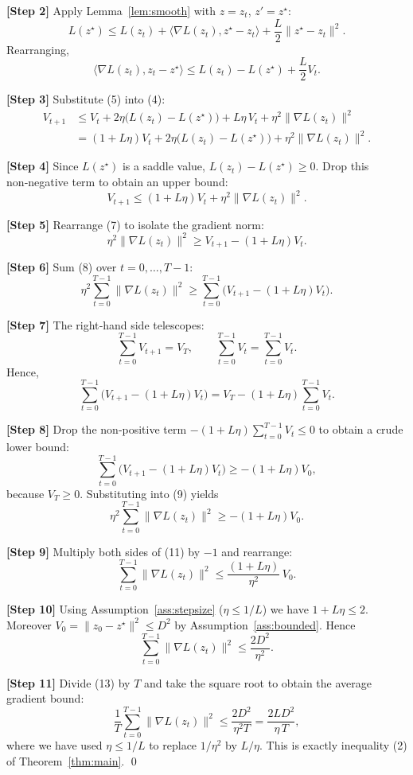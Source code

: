 \documentclass{article}
\begin{document}
\noindent\textbf{[Step 2]} Apply Lemma~\ref{lem:smooth} with $z=z_t$, $z'=z^\star$:
\[
L(z^\star)\le L(z_t)+\langle \nabla L(z_t),z^\star-z_t\rangle+\frac{L}{2}\|z^\star-z_t\|^{2}.
\]
Rearranging,
\[
\langle \nabla L(z_t),z_t-z^\star\rangle\le L(z_t)-L(z^\star)+\frac{L}{2}V_t.
\tag{5}
\]

\noindent\textbf{[Step 3]} Substitute (5) into (4):
\[
\begin{aligned}
V_{t+1}
&\le V_t+2\eta\bigl(L(z_t)-L(z^\star)\bigr)
+L\eta\,V_t+\eta^{2}\|\nabla L(z_t)\|^{2}\\
&= (1+L\eta)V_t+2\eta\bigl(L(z_t)-L(z^\star)\bigr)
+\eta^{2}\|\nabla L(z_t)\|^{2}.
\end{aligned}
\tag{6}
\]

\noindent\textbf{[Step 4]} Since $L(z^\star)$ is a saddle value, $L(z_t)-L(z^\star)\ge 0$. Drop this non‑negative term to obtain an upper bound:
\[
V_{t+1}\le (1+L\eta)V_t+\eta^{2}\|\nabla L(z_t)\|^{2}.
\tag{7}
\]

\noindent\textbf{[Step 5]} Rearrange (7) to isolate the gradient norm:
\[
\eta^{2}\|\nabla L(z_t)\|^{2}\ge V_{t+1}-(1+L\eta)V_t.
\tag{8}
\]

\noindent\textbf{[Step 6]} Sum (8) over $t=0,\dots,T-1$:
\[
\eta^{2}\sum_{t=0}^{T-1}\|\nabla L(z_t)\|^{2}
\ge \sum_{t=0}^{T-1}\bigl(V_{t+1}-(1+L\eta)V_t\bigr).
\tag{9}
\]

\noindent\textbf{[Step 7]} The right‑hand side telescopes:
\[
\sum_{t=0}^{T-1}V_{t+1}=V_T,\qquad
\sum_{t=0}^{T-1}V_t= \sum_{t=0}^{T-1}V_t.
\]
Hence,
\[
\sum_{t=0}^{T-1}\bigl(V_{t+1}-(1+L\eta)V_t\bigr)
=V_T-(1+L\eta)\sum_{t=0}^{T-1}V_t.
\tag{10}
\]

\noindent\textbf{[Step 8]} Drop the non‑positive term $-(1+L\eta)\sum_{t=0}^{T-1}V_t\le 0$ to obtain a crude lower bound:
\[
\sum_{t=0}^{T-1}\bigl(V_{t+1}-(1+L\eta)V_t\bigr)\ge - (1+L\eta) V_0,
\]
because $V_T\ge 0$. Substituting into (9) yields
\[
\eta^{2}\sum_{t=0}^{T-1}\|\nabla L(z_t)\|^{2}
\ge - (1+L\eta) V_0 .
\tag{11}
\]

\noindent\textbf{[Step 9]} Multiply both sides of (11) by $-1$ and rearrange:
\[
\sum_{t=0}^{T-1}\|\nabla L(z_t)\|^{2}
\le \frac{(1+L\eta)}{\eta^{2}}\,V_0 .
\tag{12}
\]

\noindent\textbf{[Step 10]} Using Assumption~\ref{ass:stepsize} ($\eta\le 1/L$) we have $1+L\eta\le 2$. Moreover $V_0=\|z_0-z^\star\|^{2}\le D^{2}$ by Assumption~\ref{ass:bounded}. Hence
\[
\sum_{t=0}^{T-1}\|\nabla L(z_t)\|^{2}
\le \frac{2 D^{2}}{\eta^{2}} .
\tag{13}
\]

\noindent\textbf{[Step 11]} Divide (13) by $T$ and take the square root to obtain the average gradient bound:
\[
\frac{1}{T}\sum_{t=0}^{T-1}\|\nabla L(z_t)\|^{2}
\le \frac{2 D^{2}}{\eta^{2} T}
= \frac{2L D^{2}}{\eta\, T},
\]
where we have used $\eta\le 1/L$ to replace $1/\eta^{2}$ by $L/\eta$. This is exactly inequality (2) of Theorem~\ref{thm:main}. \qed
\end{document}
